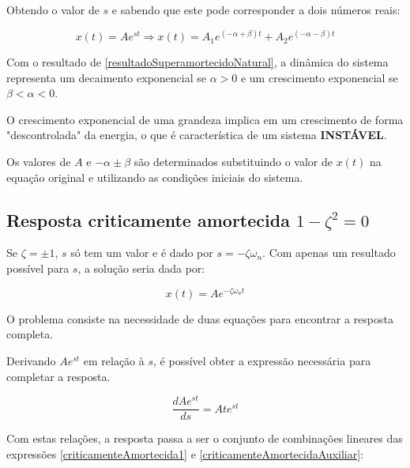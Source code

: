 \documentclass[12pt,fleqn]{book} %
\begin{document}
{Obtendo o valor de $s$ e sabendo que este pode corresponder a dois números reais:

\begin{equation}\label{resultadoSuperamortecidoNatural}
x(t) = Ae^{st} \Rightarrow x(t) = A_1e^{(-\alpha + \beta)t} + A_2e^{(-\alpha - \beta)t}
\end{equation}

Com o resultado de \ref{resultadoSuperamortecidoNatural}, a dinâmica do sistema representa um decaimento exponencial se  $\alpha > 0$ e um crescimento exponencial se $\beta < \alpha < 0$.

\begin{remark}
O crescimento exponencial de uma grandeza implica em um crescimento de forma "descontrolada" da energia, o que é característica de um sistema \textbf{INSTÁVEL}.
\end{remark}

\begin{remark}
Os valores de $A$ e $-\alpha \pm \beta$ são determinados substituindo o valor de $x(t)$ na equação original e utilizando as condições iniciais do sistema.
\end{remark}

\subsection{Resposta criticamente amortecida $1-\zeta^2 = 0$}

Se $\zeta = \pm 1$, $s$ só tem um valor e é dado por $s = -\zeta\omega_n$. Com apenas um resultado possível para $s$, a solução seria dada por:

\begin{equation}\label{criticamenteAmortecida1}
x(t) = Ae^{-\zeta\omega_nt}
\end{equation}

O problema consiste na necessidade de duas equações para encontrar a resposta completa.

Derivando $Ae^{st}$ em relação à $s$, é possível obter a expressão necessária para completar a resposta.

\begin{equation}\label{criticamenteAmortecidaAuxiliar}
\frac{dAe^{st}}{ds} = Ate^{st}
\end{equation}

Com estas relações, a resposta passa a ser o conjunto de combinações lineares das expressões \ref{criticamenteAmortecida1} e \ref{criticamenteAmortecidaAuxiliar}:


}
\end{document}
